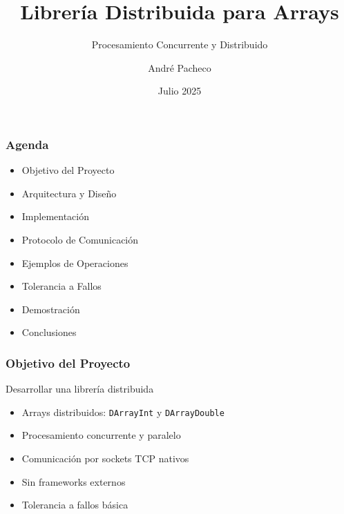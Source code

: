 \documentclass{beamer}
\title{Librería Distribuida para Arrays}
\subtitle{Procesamiento Concurrente y Distribuido}
\author{André Pacheco}
\date{Julio 2025}
\begin{document}
\maketitle

\begin{frame}
\frametitle{Agenda}
\begin{itemize}
    \item<1-> Objetivo del Proyecto
    \item<2-> Arquitectura y Diseño
    \item<3-> Implementación
    \item<4-> Protocolo de Comunicación
    \item<5-> Ejemplos de Operaciones
    \item<6-> Tolerancia a Fallos
    \item<7-> Demostración
    \item<8-> Conclusiones
\end{itemize}
\end{frame}

\begin{frame}
\frametitle{Objetivo del Proyecto}
\begin{block}{Desarrollar una librería distribuida}
    \begin{itemize}
        \item<1-> Arrays distribuidos: \texttt{DArrayInt} y \texttt{DArrayDouble}
        \item<2-> Procesamiento concurrente y paralelo
        \item<3-> Comunicación por sockets TCP nativos
        \item<4-> Sin frameworks externos
        \item<5-> Tolerancia a fallos básica
    \end{itemize}
\end{block}

\end{frame}
\end{document}
